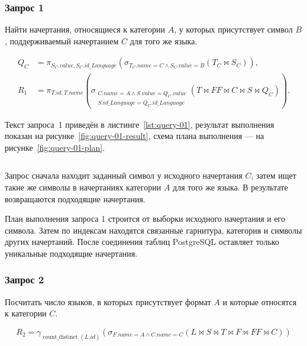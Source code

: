 \subsubsection{Запрос 1}

Найти начертания, относящиеся к категории $A$, у которых присутствует символ $B$, поддерживаемый начертанием $C$ для того же языка.

\[
\begin{aligned}
Q_C &= \pi_{S_C.value,S_C.id\_Language}
\left(\sigma_{T_C.name=C \land S_C.value=B}(T_C \bowtie S_C)\right),\\
R_1 &= \pi_{T.id,T.name}
\left(
    \sigma_{\substack{C.name=A \land S.value=Q_C.value\\ S.id\_Language=Q_C.id\_Language}}
    (T \bowtie FF \bowtie C \bowtie S \bowtie Q_C)
\right).
\end{aligned}
\]

Текст запроса~1 приведён в листинге~\ref{lst:query-01}, результат выполнения показан на рисунке~\ref{fig:query-01-result}, схема плана выполнения --- на рисунке~\ref{fig:query-01-plan}.

\label{lst:query-01}
\vspace{-10pt}
\inputminted[linenos, numbersep=10pt, firstnumber=1, fontsize=\small]{sql}{../src/queries/query_01.sql}

Запрос сначала находит заданный символ у исходного начертания $C$, затем ищет такие же символы в начертаниях категории $A$ для того же языка. В результате возвращаются подходящие начертания.


План выполнения запроса 1 строится от выборки исходного начертания и его символа. Затем по индексам находятся связанные гарнитура, категория и символы других начертаний. После соединения таблиц PostgreSQL оставляет только уникальные подходящие начертания.


\subsubsection{Запрос 2}

Посчитать число языков, в которых присутствует формат $A$ и которые относятся к категории $C$.

\[
R_2 =
\gamma_{\operatorname{count\_distinct}(L.id)}
\left(
    \sigma_{F.name=A \land C.name=C}
    (L \bowtie S \bowtie T \bowtie F \bowtie FF \bowtie C)
\right)
\]

